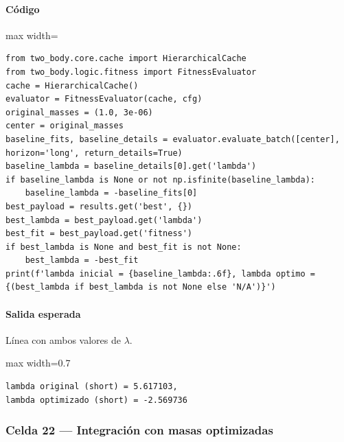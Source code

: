 \paragraph{Código}
\par\smallskip
\begin{listing}[H]
\caption{Celda 21: comparación de exponente de Lyapunov}
\begin{adjustbox}{max width=\textwidth}
\begin{minipage}{\textwidth}
\begin{verbatim}
from two_body.core.cache import HierarchicalCache
from two_body.logic.fitness import FitnessEvaluator
cache = HierarchicalCache()
evaluator = FitnessEvaluator(cache, cfg)
original_masses = (1.0, 3e-06)
center = original_masses
baseline_fits, baseline_details = evaluator.evaluate_batch([center], horizon='long', return_details=True)
baseline_lambda = baseline_details[0].get('lambda')
if baseline_lambda is None or not np.isfinite(baseline_lambda):
    baseline_lambda = -baseline_fits[0]
best_payload = results.get('best', {})
best_lambda = best_payload.get('lambda')
best_fit = best_payload.get('fitness')
if best_lambda is None and best_fit is not None:
    best_lambda = -best_fit
print(f'lambda inicial = {baseline_lambda:.6f}, lambda optimo = {(best_lambda if best_lambda is not None else 'N/A')}')
\end{verbatim}
\end{minipage}
\end{adjustbox}
\end{listing}
\paragraph{Salida esperada} Línea con ambos valores de $\lambda$.

\begin{listing}[H]
\caption{Ejemplo Salida}
\begin{adjustbox}{max width=0.7\textwidth}
\begin{minipage}{\textwidth}
\begin{verbatim}
lambda original (short) = 5.617103,
lambda optimizado (short) = -2.569736
\end{verbatim}
\end{minipage}
\end{adjustbox}
\end{listing}

\subsubsection*{Celda 22 — Integración con masas optimizadas}

